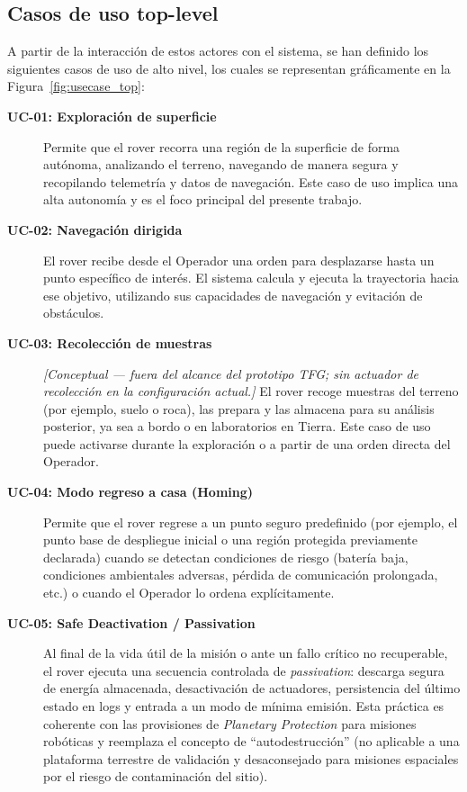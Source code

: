 \subsection{Casos de uso top-level}\label{subsec:use_cases_top_level}

A partir de la interacción de estos actores con el sistema, se han definido los siguientes casos de uso de alto nivel, los cuales se representan gráficamente en la Figura~\ref{fig:usecase_top}:

\begin{description}
  \item[\textbf{UC-01: Exploración de superficie}]
Permite que el rover recorra una región de la superficie de forma autónoma, analizando el terreno, navegando de manera segura y recopilando telemetría y datos de navegación. Este caso de uso implica una alta autonomía y es el foco principal del presente trabajo.

  \item[\textbf{UC-02: Navegación dirigida}]
El rover recibe desde el Operador una orden para desplazarse hasta un punto específico de interés. El sistema calcula y ejecuta la trayectoria hacia ese objetivo, utilizando sus capacidades de navegación y evitación de obstáculos.

  \item[\textbf{UC-03: Recolección de muestras}] \emph{[Conceptual --- fuera del alcance del prototipo TFG; sin actuador de recolección en la configuración actual.]}
El rover recoge muestras del terreno (por ejemplo, suelo o roca), las prepara y las almacena para su análisis posterior, ya sea a bordo o en laboratorios en Tierra. Este caso de uso puede activarse durante la exploración o a partir de una orden directa del Operador.

  \item[\textbf{UC-04: Modo regreso a casa (Homing)}]
Permite que el rover regrese a un punto seguro predefinido (por ejemplo, el punto base de despliegue inicial o una región protegida previamente declarada) cuando se detectan condiciones de riesgo (batería baja, condiciones ambientales adversas, pérdida de comunicación prolongada, etc.) o cuando el Operador lo ordena explícitamente.

  \item[\textbf{UC-05: Safe Deactivation / Passivation}]
Al final de la vida útil de la misión o ante un fallo crítico no recuperable, el rover ejecuta una secuencia controlada de \emph{passivation}: descarga segura de energía almacenada, desactivación de actuadores, persistencia del último estado en logs y entrada a un modo de mínima emisión. Esta práctica es coherente con las provisiones de \emph{Planetary Protection} para misiones robóticas \cite{nasa_planetary_protection} y reemplaza el concepto de ``autodestrucción'' (no aplicable a una plataforma terrestre de validación y desaconsejado para misiones espaciales por el riesgo de contaminación del sitio).
\end{description}


